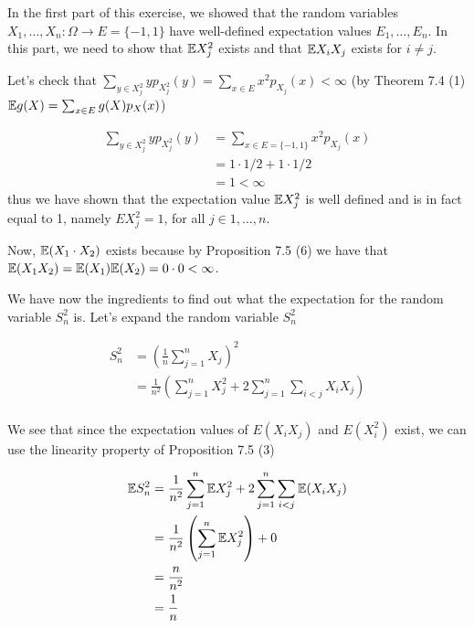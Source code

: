 
In the first part of this exercise, we showed that the random variables $ X_{1}, \dots, X_{n}:
\Omega \to E = \{ -1,1 \}    $
have well-defined expectation values $ E_1, \dots, E_{n} $. In this part, we need to show that $
\mathbb{E}  X_{j} ^2$ exists and that $ \mathbb{E} X_{i} X_{j}  $ exists for $ i \neq j$. 

Let's check that $ \sum_{y \in X_{j}^2}^{} y p_{X_{j} ^2}(y) =  \sum_{x \in E}^{} x^2 p_{X_{j}  } (x) < \infty$
(by Theorem 7.4 (1) $ \mathbb{E} g(X) = \sum_{x\in E}^{} g(X) p_{X} (x)$)

\begin{align*}
    \sum_{y \in X_{j}^2}^{} y p_{X_{j} ^2}(y) &=  \sum_{x \in E= \{ -1,1 \} }^{} x^2 p_{X_{j}  } (x)\\
					      &= 1\cdot 1/2 + 1 \cdot 1/2\\
					      &= 1 < \infty
\end{align*}
thus we have shown that the expectation value $ \mathbb{E} X_{j}^2 $ is well defined and is in fact equal to
1, namely $ E X_{j}^2 = 1 $, for all $ j \in 1, \dots, n$.

Now, $ \mathbb{E} (X_1 \cdot X_2)$ exists because by Proposition 7.5 (6) we have that $ \mathbb{E} (X_1 X_2) =
\mathbb{E}(X_1) \mathbb{E} (X_2) = 0 \cdot 0 < \infty$. 

We have now the ingredients to find out what the expectation for the random variable $ S_{n}^2$ is.
Let's expand the random variable $ S_{n}^2$

\begin{align*}
    S_{n} ^2 &= \left(  \frac{1}{n} \sum_{j=1}^{n} X_{j} \right)^2\\
	     &= \frac{1}{n^2} \left( \sum_{j=1}^{n} X_{j}^2 + 2 \sum_{j=1}^{n} \sum_{i < j}^{} 
	     X_{i} X_{j} \right) \\
\end{align*}

We see that since the expectation values of $ E(X_{i} X_{j} )$ and $ E(X_{i}^2) $ exist, we can use
the linearity property of Proposition 7.5 (3)

\begin{align*}
    \mathbb{E} S_{n} ^2 &= \frac{1}{n^2} \sum_{j=1}^{n} \mathbb{E} X_{j}^2 + 2 \sum_{j=1}^{n} \sum_{i < j}^{}
    \mathbb{E}(X_{i} X_{j})\\
		&= \frac{1}{n^2} \left( \sum_{j=1}^{n} \mathbb{E} X_{j}^2 \right) + 0 \\
		&= \frac{n}{n^2} \\
		&= \frac{1}{n} 
\end{align*}


